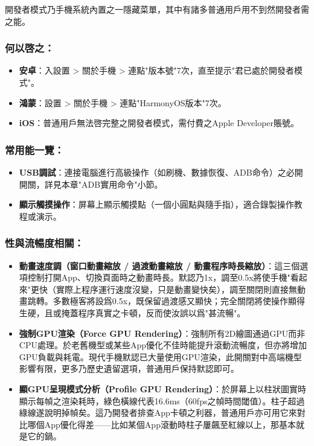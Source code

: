 


開發者模式乃手機系統內置之一隱藏菜單，其中有諸多普通用戶用不到然開發者需之能。

\subsubsection*{何以啓之：}

\begin{itemize}
  \item \textbf{安卓}：入設置 > 關於手機 > 連點"版本號"7次，直至提示"君已處於開發者模式"。
  \item \textbf{鴻蒙}：設置 > 關於手機 > 連點"HarmonyOS版本"7次。
  \item \textbf{iOS}：普通用戶無法啓完整之開發者模式，需付費之Apple Developer賬號。
\end{itemize}

\subsubsection*{常用能一覽：}

\begin{itemize}
  \item \textbf{USB調試}：連接電腦進行高級操作（如刷機、數據恢復、ADB命令）之必開開關，詳見本章"ADB實用命令"小節。
  \item \textbf{顯示觸摸操作}：屏幕上顯示觸摸點（一個小圓點與隨手指），適合錄製操作教程或演示。
\end{itemize}

\subsubsection*{性與流暢度相關：}

\begin{itemize}
  \item \textbf{動畫速度調（窗口動畫縮放 / 過渡動畫縮放 / 動畫程序時長縮放）}：這三個選項控制打開App、切換頁面時之動畫時長。默認乃1x，調至0.5x將使手機"看起來"更快（實際上程序運行速度沒變，只是動畫變快矣），調至關閉則直接無動畫跳轉。多數極客將設爲0.5x，既保留過渡感又顯快；完全關閉將使操作顯得生硬，且或掩蓋程序真實之卡頓，反而使汝誤以爲"甚流暢"。
  \item \textbf{強制GPU渲染（Force GPU Rendering）}：強制所有2D繪圖通過GPU而非CPU處理。於老舊機型或某些App優化不佳時能提升滾動流暢度，但亦將增加GPU負載與耗電。現代手機默認已大量使用GPU渲染，此開關對中高端機型影響有限，更多乃歷史遺留選項，普通用戶保持默認即可。
  \item \textbf{顯GPU呈現模式分析（Profile GPU Rendering）}：於屏幕上以柱狀圖實時顯示每幀之渲染耗時，綠色橫線代表16.6ms（60fps之幀時間閾值）。柱子超過綠線遂說明掉幀矣。這乃開發者排查App卡頓之利器，普通用戶亦可用它來對比哪個App優化得差——比如某個App滾動時柱子屢飆至紅線以上，那基本就是它的鍋。
\end{itemize}

